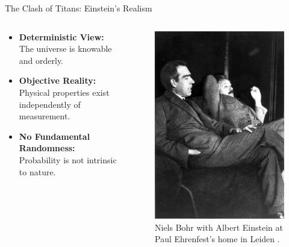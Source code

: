 \begin{frame}{The Clash of Titans: Einstein's Realism}

  \begin{columns}
    \begin{column}{0.5\textwidth}
      \begin{itemize}[<+->] %
        \item \textbf{Deterministic View:} The universe is knowable and orderly.
        \item \textbf{Objective Reality:} Physical properties exist independently of measurement.
        \item \textbf{No Fundamental Randomness:} Probability is not intrinsic to nature.
      \end{itemize}
    \end{column}

    \begin{column}{0.5\textwidth}
      \begin{center}
        \begin{figure}
          \centering
          \includegraphics[width=0.5\linewidth]{images/Borhn-Einstein.jpg}
          \caption{Niels Bohr with Albert Einstein at Paul Ehrenfest's home in Leiden \cite{IBorhEinstein}.}
        \end{figure}
      \end{center}
    \end{column}
  \end{columns}

\end{frame}

